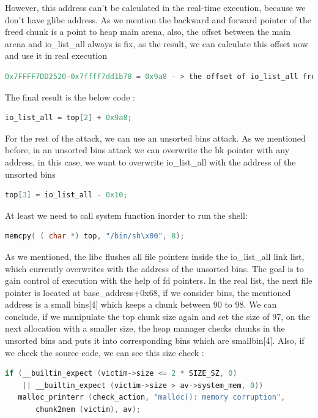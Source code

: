 \documentclass{masterthesis}
\newcommand*\libc{glibc}
\newcommand*\ub{unsorted bins}
\newcommand*\sbs{small bins}
\begin{document}
However, this address can’t be calculated in the real-time execution, because we don’t have \libc{} address. As we mention the backward and forward pointer of the freed chunk is a point to heap main arena, also, the offset between the main arena and io\_list\_all always is fix, as the result, we can calculate this offset now and use it in real execution 
\begin{lstlisting}[language=c,frame=tlrb]
0x7FFFF7DD2520-0x7ffff7dd1b78 = 0x9a8 - > the offset of io_list_all from main arena
\end{lstlisting}

The final result is the below code :

\begin{lstlisting}[language=c,frame=tlrb]
io_list_all = top[2] + 0x9a8;
\end{lstlisting}

For the rest of the attack, we can use an \ub{} attack. As we mentioned before, in an \ub{} attack we can overwrite the bk pointer with any address, in this case, we want to overwrite io\_list\_all with the address of the \ub{} 

\begin{lstlisting}[language=c,frame=tlrb]
top[3] = io_list_all - 0x10;
\end{lstlisting}

At least we need to call system function inorder to run the shell:

\begin{lstlisting}[language=c,frame=tlrb]
memcpy( ( char *) top, "/bin/sh\x00", 8);
\end{lstlisting}


As we mentioned, the libc flushes all file pointers inside the io\_list\_all link list, which currently overwrites with the address of the \ub{}. 
The goal is to gain control of execution with the help of fd pointers. In the real list, the next file pointer is located at base\_address+0x68, if we consider bins, the mentioned address is a \sbs{}[4] which keeps a chunk between 90 to 98. We can conclude, if we manipulate the top chunk size again and set the size of 97, on the next allocation with a smaller size, the heap manager checks chunks in the \ub{} and puts it into corresponding bins which are smallbin[4]. Also, if we check the source code, we can see this size check : 

\begin{lstlisting}[language=c,frame=tlrb]
if (__builtin_expect (victim->size <= 2 * SIZE_SZ, 0)
    || __builtin_expect (victim->size > av->system_mem, 0))
   malloc_printerr (check_action, "malloc(): memory corruption",
       chunk2mem (victim), av); 
\end{lstlisting}
\end{document}
